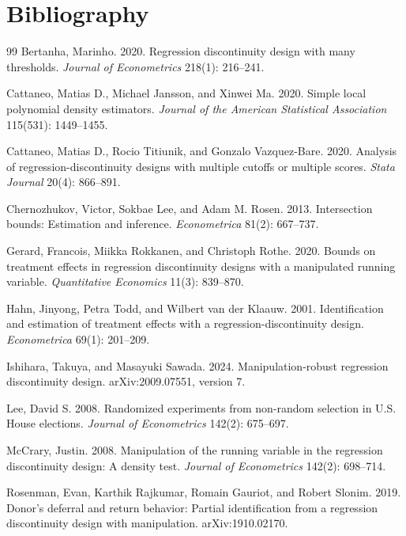 \documentclass[11pt]{article}
\theoremstyle{definition}
\theoremstyle{plain}
\theoremstyle{remark}
\begin{document}
\section*{Bibliography}
\begin{thebibliography}{99}
Bertanha, Marinho.
2020.
Regression discontinuity design with many thresholds.
\emph{Journal of Econometrics} 218(1): 216--241.

Cattaneo, Matias D., Michael Jansson, and Xinwei Ma.
2020.
Simple local polynomial density estimators.
\emph{Journal of the American Statistical Association} 115(531): 1449--1455.

Cattaneo, Matias D., Rocio Titiunik, and Gonzalo Vazquez-Bare.
2020.
Analysis of regression-discontinuity designs with multiple cutoffs or multiple scores.
\emph{Stata Journal} 20(4): 866--891.

Chernozhukov, Victor, Sokbae Lee, and Adam M. Rosen.
2013.
Intersection bounds: Estimation and inference.
\emph{Econometrica} 81(2): 667--737.

Gerard, Francois, Miikka Rokkanen, and Christoph Rothe.
2020.
Bounds on treatment effects in regression discontinuity designs with a manipulated running variable.
\emph{Quantitative Economics} 11(3): 839--870.

Hahn, Jinyong, Petra Todd, and Wilbert van der Klaauw.
2001.
Identification and estimation of treatment effects with a regression-discontinuity design.
\emph{Econometrica} 69(1): 201--209.

Ishihara, Takuya, and Masayuki Sawada.
2024.
Manipulation-robust regression discontinuity design.
arXiv:2009.07551, version 7.

Lee, David S.
2008.
Randomized experiments from non-random selection in U.S. House elections.
\emph{Journal of Econometrics} 142(2): 675--697.

McCrary, Justin.
2008.
Manipulation of the running variable in the regression discontinuity design: A density test.
\emph{Journal of Econometrics} 142(2): 698--714.

Rosenman, Evan, Karthik Rajkumar, Romain Gauriot, and Robert Slonim.
2019.
Donor's deferral and return behavior: Partial identification from a regression discontinuity design with manipulation.
arXiv:1910.02170.
\end{thebibliography}
\end{document}
